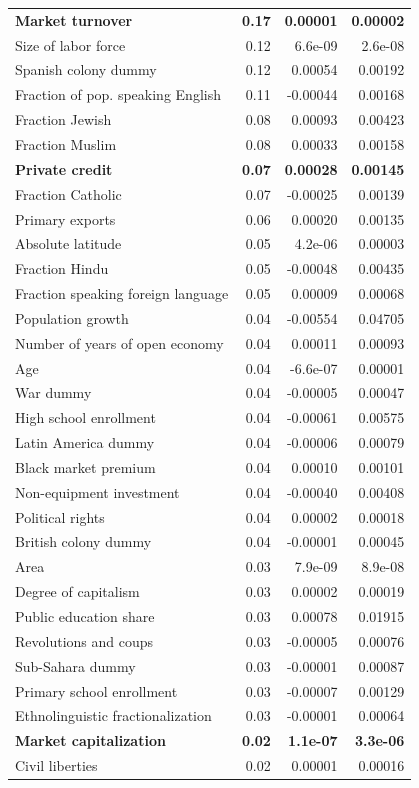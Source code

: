 \begin{table}[!htbp]
\begin{tabular}{lrrr}
		\textbf{Market turnover} & \textbf{0.17} & \textbf{0.00001} & \textbf{0.00002} \\ 
		Size of labor force & 0.12 & 6.6e-09 & 2.6e-08 \\ 
		Spanish colony dummy & 0.12 & 0.00054 & 0.00192 \\ 
		Fraction of pop. speaking English & 0.11 & -0.00044 & 0.00168 \\ 
		Fraction Jewish & 0.08 & 0.00093 & 0.00423 \\ 
		Fraction Muslim & 0.08 & 0.00033 & 0.00158 \\ 
		\textbf{Private credit} & \textbf{0.07} & \textbf{0.00028} & \textbf{0.00145} \\ 
		Fraction Catholic & 0.07 & -0.00025 & 0.00139 \\ 
		Primary exports & 0.06 & 0.00020 & 0.00135 \\ 
		Absolute latitude & 0.05 & 4.2e-06 & 0.00003 \\ 
		Fraction Hindu & 0.05 & -0.00048 & 0.00435 \\ 
		Fraction speaking foreign language & 0.05 & 0.00009 & 0.00068 \\ 
		Population growth & 0.04 & -0.00554 & 0.04705 \\ 
		Number of years of open economy & 0.04 & 0.00011 & 0.00093 \\ 
		Age & 0.04 & -6.6e-07 & 0.00001 \\ 
		War dummy & 0.04 & -0.00005 & 0.00047 \\ 
		High school enrollment & 0.04 & -0.00061 & 0.00575 \\ 
		Latin America dummy & 0.04 & -0.00006 & 0.00079 \\ 
		Black market premium & 0.04 & 0.00010 & 0.00101 \\ 
		Non-equipment investment & 0.04 & -0.00040 & 0.00408 \\ 
		Political rights & 0.04 & 0.00002 & 0.00018 \\ 
		British colony dummy & 0.04 & -0.00001 & 0.00045 \\ 
		Area & 0.03 & 7.9e-09 & 8.9e-08 \\ 
		Degree of capitalism & 0.03 & 0.00002 & 0.00019 \\ 
		Public education share & 0.03 & 0.00078 & 0.01915 \\ 
		Revolutions and coups & 0.03 & -0.00005 & 0.00076 \\ 
		Sub-Sahara dummy & 0.03 & -0.00001 & 0.00087 \\ 
		Primary school enrollment & 0.03 & -0.00007 & 0.00129 \\ 
		Ethnolinguistic fractionalization & 0.03 & -0.00001 & 0.00064 \\ 
		\textbf{Market capitalization} & \textbf{0.02} & \textbf{1.1e-07} & \textbf{3.3e-06} \\
		Civil liberties & 0.02 & 0.00001 & 0.00016 \\ 
		\bottomrule 
	\end{tabular}
\end{table}

